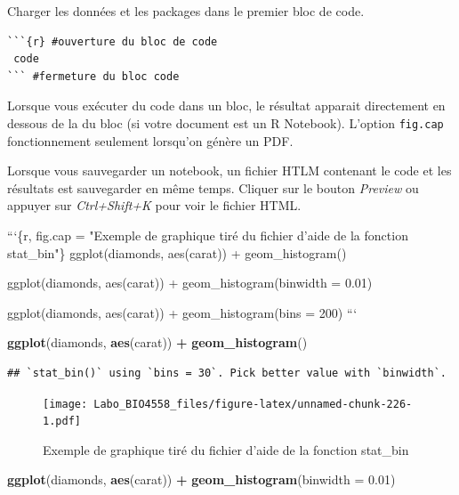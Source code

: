 \documentclass[12pt,]{book}
\newenvironment{Shaded}{\begin{snugshade}}{\end{snugshade}}
\newcommand{\BaseNTok}[1]{\textcolor[rgb]{0.06,0.06,0.06}{#1}}
\newcommand{\DataTypeTok}[1]{\textcolor[rgb]{0.27,0.27,0.27}{#1}}
\newcommand{\FloatTok}[1]{\textcolor[rgb]{0.06,0.06,0.06}{#1}}
\newcommand{\KeywordTok}[1]{\textcolor[rgb]{0.27,0.27,0.27}{\textbf{#1}}}
\newcommand{\NormalTok}[1]{#1}
\newcommand{\OperatorTok}[1]{\textcolor[rgb]{0.43,0.43,0.43}{\textbf{#1}}}
\newcommand{\StringTok}[1]{\textcolor[rgb]{0.5,0.5,0.5}{#1}}
\begin{document}
Charger les données et les packages dans le premier bloc de code.

\begin{verbatim}
```{r} #ouverture du bloc de code
 code
``` #fermeture du bloc code
\end{verbatim}

Lorsque vous exécuter du code dans un bloc, le résultat apparait directement en dessous de la du bloc (si votre document est un R Notebook).
L'option \texttt{fig.cap} fonctionnement seulement lorsqu'on génère un PDF.

Lorsque vous sauvegarder un notebook, un fichier HTLM contenant le code et les résultats est sauvegarder en même temps. Cliquer sur le bouton \emph{Preview} ou appuyer sur \emph{Ctrl+Shift+K} pour voir le fichier HTML.

\begin{Shaded}
\begin{Highlighting}[]
\BaseNTok{```\{r, fig.cap = "Exemple de graphique tiré du fichier d'aide de la fonction stat_bin"\}}
\BaseNTok{ggplot(diamonds, aes(carat)) +}
\BaseNTok{  geom_histogram()}

\BaseNTok{ggplot(diamonds, aes(carat)) +}
\BaseNTok{  geom_histogram(binwidth = 0.01)}

\BaseNTok{ggplot(diamonds, aes(carat)) +}
\BaseNTok{  geom_histogram(bins = 200)}
\BaseNTok{```}
\end{Highlighting}
\end{Shaded}

\begin{Shaded}
\begin{Highlighting}[]
\KeywordTok{ggplot}\NormalTok{(diamonds, }\KeywordTok{aes}\NormalTok{(carat)) }\OperatorTok{+}
\StringTok{  }\KeywordTok{geom_histogram}\NormalTok{()}
\end{Highlighting}
\end{Shaded}

\begin{verbatim}
## `stat_bin()` using `bins = 30`. Pick better value with `binwidth`.
\end{verbatim}

\begin{figure}
\centering
\texttt{[image: Labo\_BIO4558\_files/figure-latex/unnamed-chunk-226-1.pdf]}
\caption{\label{fig:unnamed-chunk-226-1}Exemple de graphique tiré du fichier d'aide de la fonction stat\_bin}
\end{figure}

\begin{Shaded}
\begin{Highlighting}[]
\KeywordTok{ggplot}\NormalTok{(diamonds, }\KeywordTok{aes}\NormalTok{(carat)) }\OperatorTok{+}
\StringTok{  }\KeywordTok{geom_histogram}\NormalTok{(}\DataTypeTok{binwidth =} \FloatTok{0.01}\NormalTok{)}
\end{Highlighting}
\end{Shaded}
\end{document}
